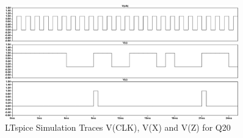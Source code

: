 \begin{figure}[!ht]
    \centering
    \includegraphics[width=0.9\textwidth]{inc/Q/Q20/Q20.pdf}
    \caption{LTspice Simulation Traces V(CLK), V(X) and V(Z) for Q20}\label{fig:Q20}
\end{figure}\FloatBarrier 
